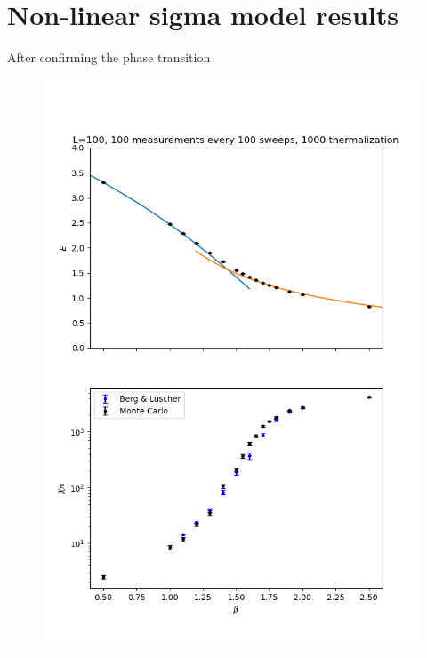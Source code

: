 \documentclass[12pt]{report}
\begin{document}
\section{Non-linear sigma model results}
After confirming the phase transition 
\begin{figure}[h]
    \centering
      \includegraphics[width=\textwidth]{imgs/internal_energy.png}
      \caption{\label{fig:bergluscher}}
\end{figure}
\end{document}
